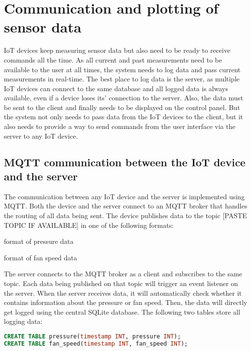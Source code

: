 \chapter{Communication and plotting of sensor data}
\label{ch:interface_pages}
IoT devices keep measuring sensor data but also need to be ready to receive commands all the time. As all current and past measurements need to be available to the user at all times, the system needs to log data and pass current measurements in real-time. The best place to log data is the server, as multiple IoT devices can connect to the same database and all logged data is always available, even if a device loses its' connection to the server. Also, the data must be sent to the client and finally needs to be displayed on the control panel. But the system not only needs to pass data from the IoT devices to the client, but it also needs to provide a way to send commands from the user interface via the server to any IoT device.



\section{MQTT communication between the IoT device and the server}
\label{sec:mqtt}
The communication between any IoT device and the server is implemented using MQTT. Both the device and the server connect to an MQTT broker that handles the routing of all data being sent. The device publishes data to the topic [PASTE TOPIC IF AVAILABLE] in one of the following formats:

format of pressure data

format of fan speed data

The server connects to the MQTT broker as a client and subscribes to the same topic. Each data being published on that topic will trigger an event listener on the server.
When the server receives data, it will automatically check whether it contains information about the pressure or fan speed. Then, the data will directly get logged using the central SQLite database. The following two tables store all logging data:

\begin{lstlisting}[label = lst:users, language = SQL, numbers = none]
CREATE TABLE pressure(timestamp INT, pressure INT);
CREATE TABLE fan_speed(timestamp INT, fan_speed INT);
\end{lstlisting}

